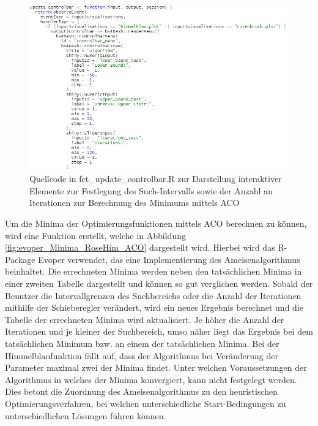 \begin{figure}[H]
 \centering
 \includegraphics[scale=0.7]{"images/04_Visualisierung_des_Algorithmus/ui_slider_for_rose_him_plots_1.png"}
 \caption{Quellcode in fct\_update\_controlbar.R zur Darstellung interaktiver Elemente zur Festlegung des Such-Intervalls sowie der Anzahl an Iterationen zur Berechnung des Minimums mittels ACO}
 \label{fig:ui_RoseHimPlot_1}
\end{figure}

Um die Minima der Optimierungsfunktionen mittels ACO berechnen zu können, wird eine Funktion erstellt, welche in Abbildung \ref{fig:evoper_Minima_RoseHim_ACO} dargestellt wird. Hierbei wird das R-Package Evoper verwendet, das eine Implementierung des Ameisenalgorithmus beinhaltet. Die errechneten Minima werden neben den tatsächlichen Minima in einer zweiten Tabelle dargestellt und können so gut verglichen werden.
Sobald der Benutzer die Intervallgrenzen des Suchbereichs oder die Anzahl der Iterationen mithilfe der Schieberegler verändert, wird ein neues Ergebnis berechnet und die Tabelle der errechneten Minima wird aktualisiert. 
Je höher die Anzahl der Iterationen und je kleiner der Suchbereich, umso näher liegt das Ergebnis bei dem tatsächlichen Minimum bzw. an einem der tatsächlichen Minima. 
\newline
Bei der Himmelblaufunktion fällt auf, dass der Algorithmus bei Veränderung der Parameter maximal zwei der Minima findet. Unter welchen Voraussetzungen der Algorithmus in welches der Minima konvergiert, kann nicht festgelegt werden. Dies betont die Zuordnung des Ameisenalgorithmus zu den heuristischen Optimierungsverfahren, bei welchen unterschiedliche Start-Bedingungen zu unterschiedlichen Lösungen führen können. 

